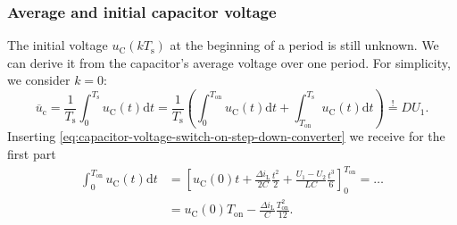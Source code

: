 \begin{frame}
    \frametitle{Average and initial capacitor voltage}
    The initial voltage $u_\mathrm{C}(k T_\mathrm{s})$ at the beginning of a period is still unknown. We can derive it from the capacitor's average voltage over one period. For simplicity, we consider $k=0$:
    \begin{equation}
            \overline{u}_\mathrm{c} = \frac{1}{T_\mathrm{s}}\int_0^{T_\mathrm{s}} u_\mathrm{C}(t) \mathrm{d}t = \frac{1}{T_\mathrm{s}}\left(\int_0^{T_\mathrm{on}} u_\mathrm{C}(t) \mathrm{d}t + \int_{T_\mathrm{on}}^{T_\mathrm{s}} u_\mathrm{C}(t) \mathrm{d}t\right)  \stackrel{!}{=} D U_1.
            \label{eq:capacitor-voltage-average-step-down-converter}
    \end{equation}
    Inserting \eqref{eq:capacitor-voltage-switch-on-step-down-converter} we receive for the first part
    \begin{equation}
        \begin{split}
            \int_0^{T_\mathrm{on}} u_\mathrm{C}(t) \mathrm{d}t &= \left[u_\mathrm{C}(0)t + \frac{\Delta i_\mathrm{L}}{2C}\frac{t^2}{2} + \frac{U_1-U_2}{LC}\frac{t^3}{6} \right]_{0}^{T_\mathrm{on}}=\ldots\\ &= u_\mathrm{C}(0) T_\mathrm{on} - \frac{\Delta i_\mathrm{L}}{C}\frac{T_\mathrm{on}^2}{12}. 
        \end{split}
    \end{equation}
\end{frame}

